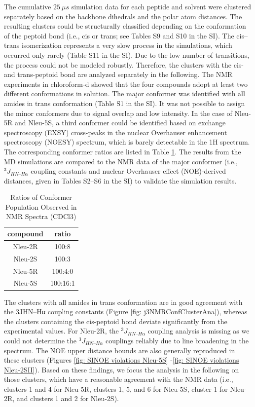 The cumulative $25~μs$ simulation data for each peptide and solvent were clustered separately based on the backbone dihedrals and the polar atom distances. The resulting clusters could be structurally classified depending on the conformation of the peptoid bond (i.e., cis or trans; see Tables S9 and S10 in the SI). 
The cis–trans isomerization represents a very slow process in the simulations, which occurred only rarely (Table S11 in the SI). Due to the low number of transitions, the process could not be modeled robustly. Therefore, the clusters with the cis- and trans-peptoid bond are analyzed separately in the following.
The NMR experiments in chloroform-d showed that the four compounds adopt at least two different conformations in solution. 
The major conformer was identified with all amides in trans conformation (Table S1 in the SI). 
It was not possible to assign the minor conformers due to signal overlap and low intensity. In the case of Nleu-5R and Nleu-5S, a third conformer could be identified based on exchange spectroscopy (EXSY) cross-peaks in the nuclear Overhauser enhancement spectroscopy (NOESY) spectrum, which is barely detectable in the 1H spectrum. The corresponding conformer ratios are listed in Table \ref{tab: nmrConfRatios}. 
The results from the MD simulations are compared to the NMR data of the major conformer (i.e., $^3J_{HN–H\alpha}$ coupling constants and nuclear Overhauser effect (NOE)-derived distances, given in Tables S2–S6 in the SI) to validate the simulation results.

\begin{table}[]
    \centering
    \begin{tabular}{c|c}
    compound & ratio \\
    \hline
    Nleu-2R &	100:8 \\
    Nleu-2S &   100:3 \\
    Nleu-5R &   100:4:0 \\
    Nleu-5S &	100:16:1 \\
    \end{tabular}
    \caption{Ratios of Conformer Population Observed in NMR Spectra (CDCl3)}
    \label{tab: nmrConfRatios}
\end{table}


The clusters with all amides in trans conformation are in good agreement with the 3JHN–Hα coupling constants (Figure \ref{fig: j3NMRConfClusterAna}), whereas the clusters containing the cis-peptoid bond deviate significantly from the experimental values. For Nleu-2R, the $^3J_{HN–H\alpha}$ coupling analysis is missing as we could not determine the $^3J_{HN–H\alpha}$ couplings reliably due to line broadening in the spectrum. The NOE upper distance bounds are also generally reproduced in these clusters (Figures \ref{fig: SINOE violations Nleu-5S} -\ref{fig: SINOE violations Nleu-2SII}). Based on these findings, we focus the analysis in the following on those clusters, which have a reasonable agreement with the NMR data (i.e., clusters 1 and 4 for Nleu-5R, clusters 1, 5, and 6 for Nleu-5S, cluster 1 for Nleu-2R, and clusters 1 and 2 for Nleu-2S).

